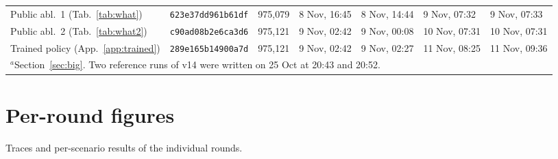 \documentclass{article}
\begin{document}
\begin{table}[!htb]
\begin{tabular}{lllllll}
Public abl.\ 1 (Tab.~\ref{tab:what}) & \texttt{623e37dd961b61df} & 975,079 & 8 Nov, 16:45 & 8 Nov, 14:44 & 9 Nov, 07:32 & 9 Nov, 07:33\\
Public abl.\ 2 (Tab.~\ref{tab:what2}) & \texttt{c90ad08b2e6ca3d6} & 975,121 & 9 Nov, 02:42 & 9 Nov, 00:08 & 10 Nov, 07:31 & 10 Nov, 07:31\\
Trained policy (App.~\ref{app:trained}) & \texttt{289e165b14900a7d} & 975,121 & 9 Nov, 02:42 & 9 Nov, 02:27 & 11 Nov, 08:25 & 11 Nov, 09:36\\\bottomrule
\multicolumn{7}{l}{\footnotesize $^{a}$Section~\ref{sec:big}. Two reference runs of v14 were written on 25 Oct at 20:43 and 20:52.}
\end{tabular}
\end{table}

\clearpage
\section{Per-round figures}\label{app:figs}
Traces and per-scenario results of the individual rounds.
\end{document}
